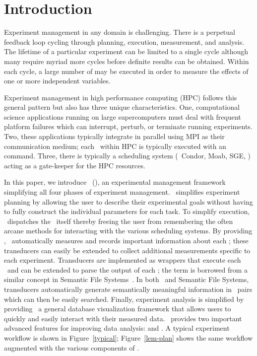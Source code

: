 \section{Introduction}
Experiment management in any domain is challenging.  There is a perpetual
feedback loop cycling through planning, execution, measurement, and analysis.
The lifetime of a particular experiment can be limited to a single cycle 
although many require myriad more cycles before definite results can be 
obtained.  Within each cycle, a large number of \Term{\subs} may be executed
in order to measure the effects of one or more independent variables.  

Experiment management in high performance computing (HPC) follows this general
pattern but also has three unique characteristics.  One, computational science
applications running on large supercomputers must deal with frequent platform
failures which can interrupt, perturb, or terminate running experiments.  Two,
these applications typically integrate in parallel using MPI as their
communication medium; each \sub\ within HPC is typically executed with an
 command.  Three, there is typically a scheduling system (\eg\
Condor, Moab, SGE, \etc) acting as a gate-keeper for the HPC resources.

In this paper, we introduce \namefull\ (\name), an experimental management
framework simplifying all four phases of experiment management.  \name\
simplifies experiment planning by allowing the user to describe their
experimental goals without having to fully construct the individual parameters
for each task.  To simplify execution, \name\ dispatches the \subs\ itself
thereby freeing the user from remembering the often arcane methods for
interacting with the various scheduling systems.  By providing
\Term{transducers}, \name\ automatically measures and records important
information about each \sub; these transducers can easily be extended to
collect additional measurements specific to each experiment.  Transducers are
implemented as wrappers that execute each \sub\ and can be extended to parse
the output of each \sub;  the term is borrowed from a similar concept in
Semantic File Systems~\cite{gifford-sfs}.  In both \name\ and Semantic File
Systems, transducers automatically generate semantically meaningful information
in \kv\ pairs which can then be easily searched.  Finally, experiment analysis
is simplified by providing \dbviz\, a general database visualization framework
that allows users to quickly and easily interact with their measured data.
\dbviz\ provides two important advanced features for improving data analysis:
\Term{outlier analysis} and \Term{hidden difference search}.  A typical
experiment workflow is shown in Figure~\ref{typical}; Figure~\ref{lem-plan}
shows the same workflow augmented with the various components of \name.

